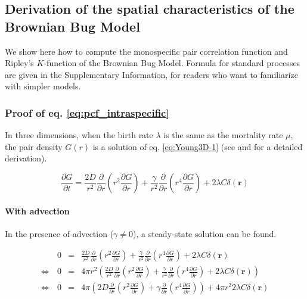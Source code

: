 \documentclass[english]{article}
\begin{document}
\renewcommand\thesection{A\arabic{section}}
\setcounter{section}{0}
\renewcommand\thefigure{A\arabic{figure}}
\setcounter{figure}{0}
\renewcommand\thetable{A\arabic{table}}

\subsection*{Derivation of the spatial characteristics of the Brownian Bug Model}

We show here how to compute the monospecific pair correlation function
and Ripley's $K$-function of the Brownian Bug Model. Formula for
standard processes are given in the Supplementary Information, for
readers who want to familiarize with simpler models. 

\subsubsection*{Proof of eq. \ref{eq:pcf_intraspecific}}

In three dimensions, when the birth rate $\lambda$ is the same as
the mortality rate $\mu$, the pair density $G(r)$  is a solution
of eq. \ref{eq:Young3D-1} (see \citealp{young_reproductive_2001}
and \citealp{picoche_rescience_2022} for a detailed derivation).

\begin{equation}
\frac{\partial G}{\partial t}=\frac{2D}{r^{2}}\frac{\partial}{\partial r}\left(r^{2}\frac{\partial G}{\partial r}\right)+\frac{\gamma}{r^{2}}\frac{\partial}{\partial r}\left(r^{4}\frac{\partial G}{\partial r}\right)+2\lambda C\delta(\boldsymbol{r})\label{eq:Young3D-1}
\end{equation}


\paragraph{With advection}

In the presence of advection ($\gamma\neq0$), a steady-state solution
can be found. 

\begin{onehalfspace}
\noindent 
\begin{align}
 & \,0 & = & \frac{2D}{r^{2}}\frac{\partial}{\partial r}\left(r^{2}\frac{\partial G}{\partial r}\right)+\frac{\gamma}{r^{2}}\frac{\partial}{\partial r}\left(r^{4}\frac{\partial G}{\partial r}\right)+2\lambda C\delta(\boldsymbol{r})\nonumber \\
\Leftrightarrow & \,0 & = & 4\pi r^{2}\left(\frac{2D}{r^{2}}\frac{\partial}{\partial r}\left(r^{2}\frac{\partial G}{\partial r}\right)+\frac{\gamma}{r^{2}}\frac{\partial}{\partial r}\left(r^{4}\frac{\partial G}{\partial r}\right)+2\lambda C\delta(\boldsymbol{r})\right)\nonumber \\
\Leftrightarrow & \,0 & = & 4\pi\left(2D\frac{\partial}{\partial r}\left(r^{2}\frac{\partial G}{\partial r}\right)+\gamma\frac{\partial}{\partial r}\left(r^{4}\frac{\partial G}{\partial r}\right)\right)+4\pi r^{2}2\lambda C\delta(\boldsymbol{r})\label{eq:steady_state}
\end{align}

\end{onehalfspace}
\end{document}
